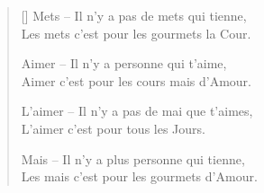 


\newpage

\settowidth{\versewidth}{Les mets c'est pour les gourmets la Cour.}
\begin{verse}[\versewidth]
Mets -- Il n'y a pas de mets qui tienne, \\
Les mets c'est pour les gourmets la Cour.

Aimer -- Il n'y a personne qui t'aime, \\
Aimer c'est pour les cours mais d'Amour.

L'aimer -- Il n'y a pas de mai que t'aimes, \\
L'aimer c'est pour tous les Jours.

Mais -- Il n'y a plus personne qui tienne, \\
Les mais c'est pour les gourmets d'Amour.
\end{verse}



